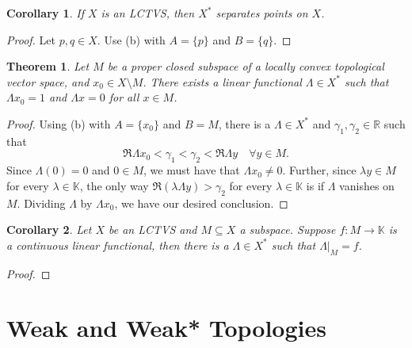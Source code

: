 \documentclass[12pt]{article}
\theoremstyle{thmstyle}
\newtheorem{theorem}{Theorem}[section]
\theoremstyle{defstyle}
\newtheorem*{corollary}{Corollary}
\newcommand{\R}{\mathbb{R}}
\newcommand{\bbC}{\mathbb{C}}
\newcommand{\K}{\mathbb{K}} %
\begin{document}
\begin{corollary}
    If $X$ is an LCTVS, then $X^\ast$ separates points on $X$.
\end{corollary}
\begin{proof}
    Let $p, q\in X$. Use  (b) with $A = \{p\}$ and $B = \{q\}$.
\end{proof}

\begin{theorem}
    Let $M$ be a proper closed subspace of a locally convex topological vector space, and $x_0\in X\setminus M$. There exists a linear functional $\Lambda\in X^\ast$ such that $\Lambda x_0 = 1$ and $\Lambda x = 0$ for all $x\in M$.
\end{theorem}
\begin{proof}
    Using (b) with $A = \{x_0\}$ and $B = M$, there is a $\Lambda\in X^\ast$ and $\gamma_1,\gamma_2\in\R$ such that 
    \begin{equation*}
        \Re\Lambda x_0 < \gamma_1 < \gamma_2 < \Re\Lambda y\quad\forall y\in M.
    \end{equation*}
    Since $\Lambda(0) = 0$ and $0\in M$, we must have that $\Lambda x_0\ne 0$. Further, since $\lambda y\in M$ for every $\lambda\in\K$, the only way $\Re(\lambda\Lambda y) > \gamma_2$ for every $\lambda\in\K$ is if $\Lambda$ vanishes on $M$. Dividing $\Lambda$ by $\Lambda x_0$, we have our desired conclusion.
\end{proof}

\begin{corollary}
    Let $X$ be an LCTVS and $M\subseteq X$ a subspace. Suppose $f: M\to\K$ is a continuous linear functional, then there is a $\Lambda\in X^\ast$ such that $\Lambda|_M = f$.
\end{corollary}
\begin{proof}
\end{proof}

\section{Weak and Weak* Topologies}
\end{document}
